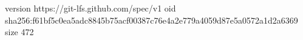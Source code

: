 version https://git-lfs.github.com/spec/v1
oid sha256:f61bf5c0ea5adc8845b75acf00387c76e4a2e779a4059d87e5a0572a1d2a6369
size 472
